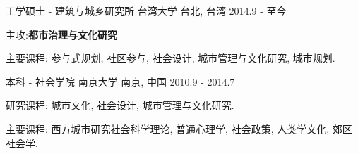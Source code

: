 \begin{cventries}
  \cventry
    {工学硕士 - 建筑与城乡研究所}
    {台湾大学}
    {台北, 台湾}
    {2014.9 - 至今}
    {
      \begin{cvitems}
  		\item {主攻:\textbf{都市治理与文化研究} } 
        \item {主要课程: 参与式规划, 社区参与, 社会设计, 城市管理与文化研究, 城市规划.}     
      \end{cvitems}
    }
  \cventry
    {本科 - 社会学院}
    {南京大学}
    {南京, 中国}
    {2010.9 - 2014.7}
    {
      \begin{cvitems}
 		\item {研究课程: 城市文化, 社会设计, 城市管理与文化研究.}
        \item {主要课程: 西方城市研究社会科学理论, 普通心理学, 社会政策, 人类学文化, 郊区社会学.}        
      \end{cvitems}
    }
\end{cventries}
